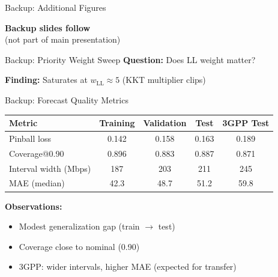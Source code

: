 \documentclass[aspectratio=169]{beamer}
\begin{document}
\begin{frame}{Backup: Additional Figures}
\begin{center}
\textbf{Backup slides follow}\\
(not part of main presentation)
\end{center}
\end{frame}

\begin{frame}{Backup: Priority Weight Sweep}
\textbf{Question:} Does LL weight matter?

\begin{center}
\end{center}

\textbf{Finding:} Saturates at $w_{\text{LL}} \approx 5$ (KKT multiplier clips)
\end{frame}

\begin{frame}{Backup: Forecast Quality Metrics}
\begin{table}
\small
\begin{tabular}{lcccc}
\toprule
\textbf{Metric} & \textbf{Training} & \textbf{Validation} & \textbf{Test} & \textbf{3GPP Test} \\
\midrule
Pinball loss & 0.142 & 0.158 & 0.163 & 0.189 \\
Coverage@0.90 & 0.896 & 0.883 & 0.887 & 0.871 \\
Interval width (Mbps) & 187 & 203 & 211 & 245 \\
MAE (median) & 42.3 & 48.7 & 51.2 & 59.8 \\
\bottomrule
\end{tabular}
\end{table}

\textbf{Observations:}
\begin{itemize}
    \item Modest generalization gap (train $\rightarrow$ test)
    \item Coverage close to nominal (0.90)
    \item 3GPP: wider intervals, higher MAE (expected for transfer)
\end{itemize}
\end{frame}
\end{document}
